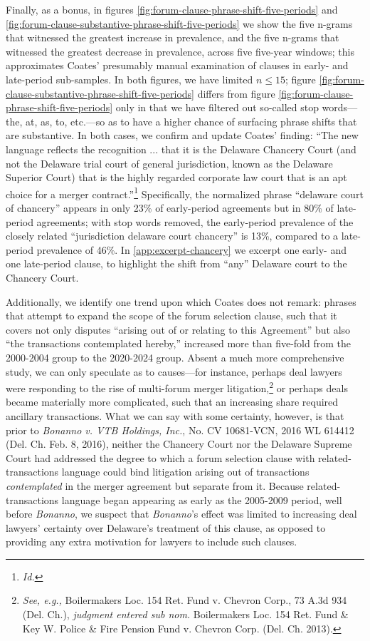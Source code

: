 \documentclass[12pt]{article}
\begin{document}
{Finally, as a bonus, in figures \ref{fig:forum-clause-phrase-shift-five-periods} and \ref{fig:forum-clause-substantive-phrase-shift-five-periods} we show the five n-grams that witnessed the greatest increase in prevalence, and the five n-grams that witnessed the greatest decrease in prevalence, across five five-year windows; this approximates Coates' presumably manual examination of clauses in early- and late-period sub-samples. In both figures, we have limited $n \le 15$; figure \ref{fig:forum-clause-substantive-phrase-shift-five-periods} differs from figure \ref{fig:forum-clause-phrase-shift-five-periods} only in that we have filtered out so-called stop words—the, at, as, to, etc.—so as to have a higher chance of surfacing phrase shifts that are substantive. In both cases, we confirm and update Coates' finding: ``The new language reflects the recognition ... that it is the Delaware Chancery Court (and not the Delaware trial court of general jurisdiction, known as the Delaware Superior Court) that is the highly regarded corporate law court that is an apt choice for a merger contract.''\footnote{\emph{Id.}} Specifically, the normalized phrase ``delaware court of chancery'' appears in only 23\% of early-period agreements but in 80\% of late-period agreements; with stop words removed, the early-period prevalence of the closely related ``jurisdiction delaware court chancery'' is 13\%, compared to a late-period prevalence of 46\%. In \autoref{app:excerpt-chancery} we excerpt one early- and one late-period clause, to highlight the shift from ``any'' Delaware court to the Chancery Court.

Additionally, we identify one trend upon which Coates does not remark: phrases that attempt to expand the scope of the forum selection clause, such that it covers not only disputes ``arising out of or relating to this Agreement'' but also ``the transactions contemplated hereby,'' increased more than five-fold from the 2000-2004 group to the 2020-2024 group. Absent a much more comprehensive study, we can only speculate as to causes—for instance, perhaps deal lawyers were responding to the rise of multi-forum merger litigation,\footnote{\emph{See, e.g.,} Boilermakers Loc. 154 Ret. Fund v. Chevron Corp., 73 A.3d 934 (Del. Ch.), \emph{judgment entered sub nom.} Boilermakers Loc. 154 Ret. Fund \& Key W. Police \& Fire Pension Fund v. Chevron Corp. (Del. Ch. 2013).} or perhaps deals became materially more complicated, such that an increasing share required ancillary transactions. What we can say with some certainty, however, is that prior to \emph{Bonanno v. VTB Holdings, Inc.}, No. CV 10681-VCN, 2016 WL 614412 (Del. Ch. Feb. 8, 2016), neither the Chancery Court nor the Delaware Supreme Court had addressed the degree to which a forum selection clause with related-transactions language could bind litigation arising out of transactions \emph{contemplated} in the merger agreement but separate from it. Because related-transactions language began appearing as early as the 2005-2009 period, well before \emph{Bonanno}, we suspect that \emph{Bonanno}'s effect was limited to increasing deal lawyers' certainty over Delaware's treatment of this clause, as opposed to providing any extra motivation for lawyers to include such clauses.

}
\end{document}
